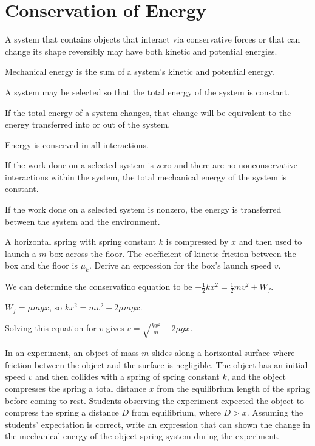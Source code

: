 \documentclass[../mech.tex]{subfiles}
\begin{document}
\section{Conservation of Energy}
A system that contains objects that interact via conservative forces or that can change its shape reversibly may have both kinetic and potential energies.

Mechanical energy is the sum of a system's kinetic and potential energy.

A system may be selected so that the total energy of the system is constant.

If the total energy of a system changes, that change will be equivalent to the energy transferred into or out of the system.

Energy is conserved in all interactions.

If the work done on a selected system is zero and there are no nonconservative interactions within the system, the total mechanical energy of the system is constant.

If the work done on a selected system is nonzero, the energy is transferred between the system and the environment.

\begin{example}
    A horizontal spring with spring constant $k$ is compressed by $x$ and then used to launch a $m$ box across the floor. The coefficient of kinetic friction between the box and the floor 
    is $\mu_k$. Derive an expression for the box's launch speed $v$.

    We can determine the conservatino equation to be $-\frac{1}{2}kx^2=\frac{1}{2}mv^2+W_f$.

    $W_f=\mu mgx$, so $kx^2=mv^2+2\mu mgx$.

    Solving this equation for $v$ gives $v=\sqrt{\frac{kx^2}{m}-2\mu gx}$.
\end{example}

\ex In an experiment, an object of mass $m$ slides along a horizontal surface where friction between the object and the surface is negligible. The object has an initial speed $v$ and then collides with a spring of spring constant $k$, and the object compresses the spring a total distance 
$x$ from the equilibrium length of the spring before coming to rest. Students observing the experiment expected the object to compress the spring a distance $D$ from equilibrium, where $D>x$.
Assuming the students' expectation is correct, write an expression that can shown the change in the mechanical energy of the object-spring system during the experiment.
\end{document}
